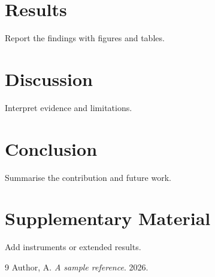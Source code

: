 \documentclass[12pt,a4paper,oneside]{report}
\begin{document}
\chapter{Results} Report the findings with figures and tables.
\chapter{Discussion} Interpret evidence and limitations.
\chapter{Conclusion} Summarise the contribution and future work.
\appendix\chapter{Supplementary Material} Add instruments or extended results.
\begin{thebibliography}{9} Author, A. \emph{A sample reference}. 2026.\end{thebibliography}
\end{document}
